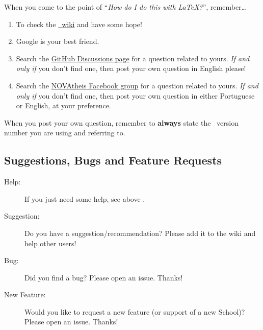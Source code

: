When you come to the point of “\emph{How do I do this with \LaTeX?}”, remember…

\begin{enumerate}
  \item To check the \href{https://github.com/joaomlourenco/novathesis/wiki}{\novathesis\ wiki} and have some hope!  \emojiSmile
  \item Google is your best friend.
  \item Search the \href{https://github.com/joaomlourenco/novathesis/discussions}{GitHub Discussions page} for a question related to yours.  \emph{If and only if} you don't find one, then post your own question in English please!
  \item Search the \href{https://www.facebook.com/groups/novathesis}{NOVAtheis Facebook group} for a question related to yours.  \emph{If and only if} you don't find one, then post your own question in either Portuguese or English, at your preference.
\end{enumerate}

When you post your own question, remember to \textbf{always} state the \novathesis\ version number you are using and referring to.

\begin{center}  
\end{center}
 

\subsection{Suggestions, Bugs and Feature Requests} %
\label{sub:suggestions_bugs_and_feature_requests}

\begin{description}
  \item[Help:] If you just need some help, see above .
  \item[Suggestion:] Do you have a suggestion/recommendation? Please add it to the wiki and help other users!
  \item[Bug:] Did you find a bug? Please open an issue. Thanks!
  \item[New Feature:] Would you like to request a new feature (or support of a new School)? Please open an issue. Thanks!

\end{description}



